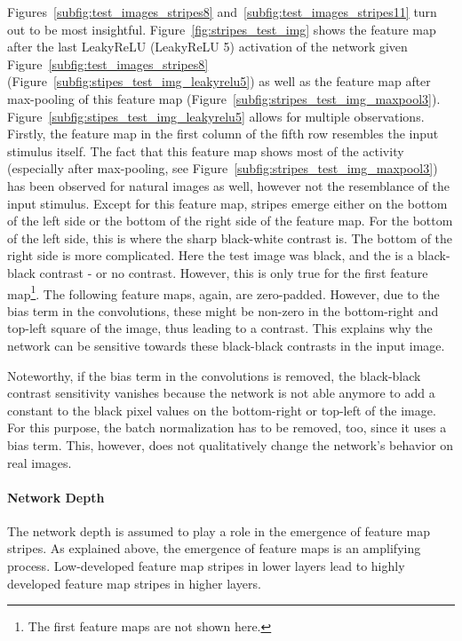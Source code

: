 Figures~\ref{subfig:test_images_stripes8} and~\ref{subfig:test_images_stripes11} turn out to be most insightful.
Figure~\ref{fig:stripes_test_img} shows the feature map after the last LeakyReLU (LeakyReLU 5) activation of the network given Figure~\ref{subfig:test_images_stripes8} (Figure~\ref{subfig:stipes_test_img_leakyrelu5}) as well as the feature map after max-pooling of this feature map (Figure~\ref{subfig:stripes_test_img_maxpool3}).
Figure~\ref{subfig:stipes_test_img_leakyrelu5} allows for multiple observations.
Firstly, the feature map in the first column of the fifth row resembles the input stimulus itself.
The fact that this feature map shows most of the activity (especially after max-pooling, see Figure~\ref{subfig:stripes_test_img_maxpool3}) has been observed for natural images as well, however not the resemblance of the input stimulus.
Except for this feature map, stripes emerge either on the bottom of the left side or the bottom of the right side of the feature map.
For the bottom of the left side, this is where the sharp black-white contrast is.
The bottom of the right side is more complicated.
Here the test image was black, and the  is a black-black contrast - or no contrast.
However, this is only true for the first feature map\footnote{The first feature maps are not shown here.}.
The following feature maps, again, are zero-padded.
However, due to the bias term in the convolutions, these might be non-zero in the bottom-right and top-left square of the image, thus leading to a contrast.
This explains why the network can be sensitive towards these black-black contrasts in the input image.

Noteworthy, if the bias term in the convolutions is removed, the black-black contrast sensitivity vanishes because the network is not able anymore to add a constant to the black pixel values on the bottom-right or top-left of the image.
For this purpose, the batch normalization has to be removed, too, since it uses a bias term.
This, however, does not qualitatively change the network's behavior on real images.

\paragraph{Network Depth}
The network depth is assumed to play a role in the emergence of feature map stripes.
As explained above, the emergence of feature maps is an amplifying process.
Low-developed feature map stripes in lower layers lead to highly developed feature map stripes in higher layers.

